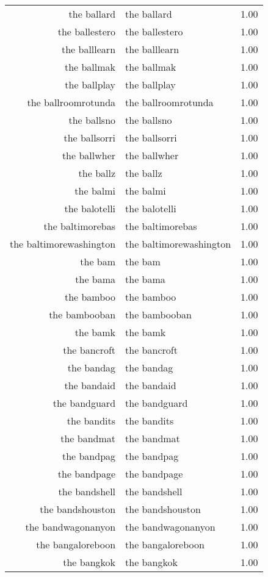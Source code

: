 \begin{table}[ht]
\begin{tabular}{rlr}
  the ballard & the ballard & 1.00 \\ 
  the ballestero & the ballestero & 1.00 \\ 
  the balllearn & the balllearn & 1.00 \\ 
  the ballmak & the ballmak & 1.00 \\ 
  the ballplay & the ballplay & 1.00 \\ 
  the ballroomrotunda & the ballroomrotunda & 1.00 \\ 
  the ballsno & the ballsno & 1.00 \\ 
  the ballsorri & the ballsorri & 1.00 \\ 
  the ballwher & the ballwher & 1.00 \\ 
  the ballz & the ballz & 1.00 \\ 
  the balmi & the balmi & 1.00 \\ 
  the balotelli & the balotelli & 1.00 \\ 
  the baltimorebas & the baltimorebas & 1.00 \\ 
  the baltimorewashington & the baltimorewashington & 1.00 \\ 
  the bam & the bam & 1.00 \\ 
  the bama & the bama & 1.00 \\ 
  the bamboo & the bamboo & 1.00 \\ 
  the bambooban & the bambooban & 1.00 \\ 
  the bamk & the bamk & 1.00 \\ 
  the bancroft & the bancroft & 1.00 \\ 
  the bandag & the bandag & 1.00 \\ 
  the bandaid & the bandaid & 1.00 \\ 
  the bandguard & the bandguard & 1.00 \\ 
  the bandits & the bandits & 1.00 \\ 
  the bandmat & the bandmat & 1.00 \\ 
  the bandpag & the bandpag & 1.00 \\ 
  the bandpage & the bandpage & 1.00 \\ 
  the bandshell & the bandshell & 1.00 \\ 
  the bandshouston & the bandshouston & 1.00 \\ 
  the bandwagonanyon & the bandwagonanyon & 1.00 \\ 
  the bangaloreboon & the bangaloreboon & 1.00 \\ 
  the bangkok & the bangkok & 1.00 \\ 

\end{tabular}
\end{table}
